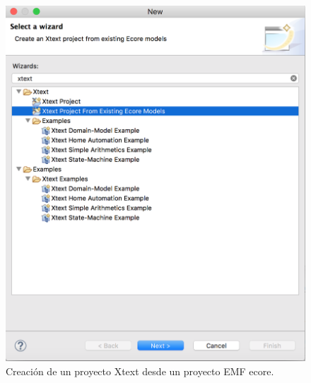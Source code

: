 \begin{figure}
	\centering
    \includegraphics[scale=0.4]{images/emf_capturas/xtext-desde-ecore-paso1}
    \sourcepropia{}
    \caption{Creación de un proyecto Xtext desde un proyecto EMF ecore.}
    \label{fig:xtext_desde_ecore1}
\end{figure}
